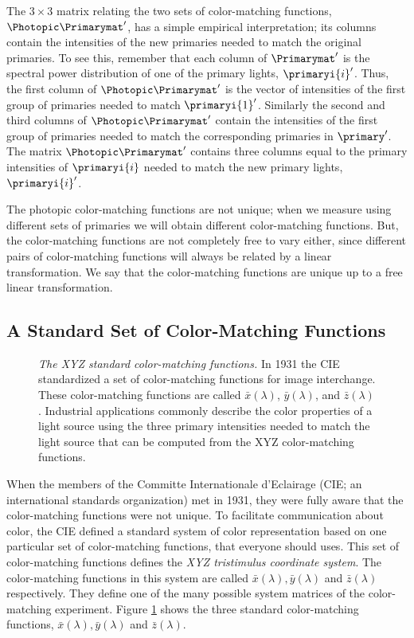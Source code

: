 The $3 \times 3$ matrix relating the two sets of 
color-matching functions, $\Photopic \Primarymat '$,
has a simple empirical interpretation;
its columns contain the
intensities of the new primaries
needed to match the original primaries.
To see this,
remember that each column of $\Primarymat '$ 
is the spectral power distribution
of one of the primary lights, $\primaryi{i} '$.
Thus, the first column of $\Photopic \Primarymat '$ is
the vector of intensities of the first group of primaries
needed to match $\primaryi{1} '$.
Similarly the second and third columns of $\Photopic \Primarymat '$
contain the intensities of the first group of primaries
needed to match the corresponding primaries in $\primary '$.
The matrix $\Photopic \Primarymat '$ contains three columns
equal to the primary intensities of $\primaryi{i}$
needed to match the new primary lights, $\primaryi{i} '$.

The photopic color-matching functions are not unique;
when we measure using different sets of primaries we
will obtain different color-matching functions.
But, the color-matching functions are not completely
free to vary either, since
different pairs of color-matching functions
will always be related by a linear transformation.
We say that the color-matching functions are unique up to a
free linear transformation.

\subsection*{A Standard Set of Color-Matching Functions}
\begin{figure}
\centerline {
}
\caption[CIE Standard XYZ Functions]{
{\em The XYZ standard color-matching functions.}
In 1931 the CIE standardized a set of color-matching functions
for image interchange.
These color-matching functions
are called $\bar{x}(\lambda)$, $\bar{y}(\lambda)$, 
and $\bar{z}(\lambda)$.
Industrial applications commonly describe the color properties
of a light source using the three primary intensities needed to match
the light source that can be computed from the XYZ color-matching functions.
}
\label{f3:XYZ}
\end{figure}
When the members of the Committe Internationale d'Eclairage (CIE;
an international standards organization) met in 1931, they were fully
aware that the color-matching functions were not unique.
To facilitate communication about color,
the CIE defined a standard system of color representation
based on one particular set of color-matching functions, 
that everyone should uses.
This set of color-matching
functions defines the {\em XYZ tristimulus coordinate system}.
The color-matching functions
in this system are called 
$\bar{x}(\lambda), \bar{y}(\lambda)$ and $\bar{z}(\lambda)$
respectively.
They define one of the many possible system matrices
of the color-matching experiment.
Figure \ref{f3:XYZ} shows the three standard color-matching functions,
$\bar{x}(\lambda), \bar{y}(\lambda)$ and $\bar{z}(\lambda)$.

